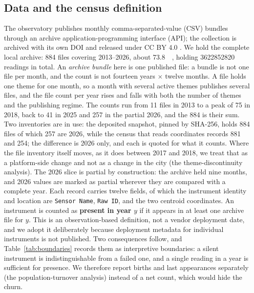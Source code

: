 \documentclass[fleqn,10pt,lineno]{wlpeerj}
\newcommand{\nArchiveFiles}{884}
\newcommand{\nArchiveGB}{73.8}
\newcommand{\nArchiveReadings}{3622852820}
\newcommand{\nFilesLast}{257}
\begin{document}
\subsection*{Data and the census definition}
\label{sec:data}

The observatory publishes monthly comma-separated-value (CSV) bundles through an
archive application-programming interface (API); the collection is archived with its own
DOI and released under CC BY 4.0 \citep{uo_archive}. We hold the
complete local archive: \num{\nArchiveFiles} files covering 2013--2026, about \SI{\nArchiveGB}{\giga\byte},
holding \num{\nArchiveReadings} readings in total. An \emph{archive bundle} here is one
published file: a bundle is not one file per month, and the count is not fourteen years
$\times$ twelve months. A file holds one theme for one month, so a month with several active
themes publishes several files, and the file count per year rises and falls with both the
number of themes and the publishing regime. The counts run from \num{11} files in 2013 to a
peak of \num{75} in 2018, back to \num{41} in 2025 and \nFilesLast{} in the partial 2026, and the
\nArchiveFiles{} is their sum. Two inventories are in use: the deposited snapshot, pinned by
SHA-256, holds \num{884} files of which \num{257} are 2026, while the census that reads
coordinates records \num{881} and \num{254}; the difference is 2026 only, and each is quoted for
what it counts. Where the file inventory itself moves, as it does between 2017 and 2018, we
treat that as a platform-side change and not as a change in the city
(the theme-discontinuity analysis). The 2026 slice is partial by
construction: the archive held nine months, and 2026 values are marked as partial wherever they
are compared with a complete year. Each record carries twelve
fields, of which the instrument identity and location are \texttt{Sensor~Name},
\texttt{Raw~ID}, and the two centroid coordinates.
An instrument is counted as \textbf{present in year $y$} if it appears in at least one
archive file for $y$. This is an observation-based definition, not a vendor deployment
date, and we adopt it deliberately because deployment metadata for individual
instruments is not published. Two consequences follow, and Table~\ref{tab:boundaries}
records them as interpretive boundaries: a silent instrument is indistinguishable from
a failed one, and a single reading in a year is sufficient for presence. We therefore
report births and last appearances separately (the population-turnover analysis)
instead of a net count, which would hide the churn.
\end{document}
